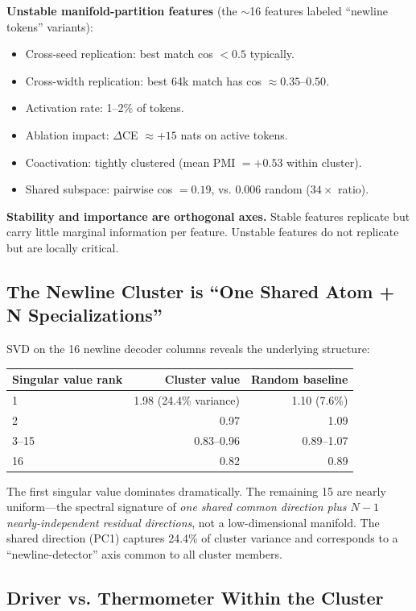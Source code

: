 \documentclass[11pt]{article}
\begin{document}
\textbf{Unstable manifold-partition features} (the $\sim$16 features labeled
``newline tokens'' variants):
\begin{itemize}[leftmargin=*]
  \item Cross-seed replication: best match cos $< 0.5$ typically.
  \item Cross-width replication: best 64k match has cos $\approx 0.35$--$0.50$.
  \item Activation rate: 1--2\% of tokens.
  \item Ablation impact: $\Delta$CE $\approx +15$ nats on active tokens.
  \item Coactivation: tightly clustered (mean PMI $= +0.53$ within cluster).
  \item Shared subspace: pairwise cos $= 0.19$, vs. 0.006 random ($34\times$ ratio).
\end{itemize}

\textbf{Stability and importance are orthogonal axes.} Stable features replicate
but carry little marginal information per feature. Unstable features do not
replicate but are locally critical.

\subsection{The Newline Cluster is ``One Shared Atom + N Specializations''}

SVD on the 16 newline decoder columns reveals the underlying structure:

\begin{tabular}{lrr}
\toprule
Singular value rank & Cluster value & Random baseline \\
\midrule
1 & 1.98 (24.4\% variance) & 1.10 (7.6\%) \\
2 & 0.97 & 1.09 \\
3--15 & 0.83--0.96 & 0.89--1.07 \\
16 & 0.82 & 0.89 \\
\bottomrule
\end{tabular}

The first singular value dominates dramatically. The remaining 15 are nearly
uniform---the spectral signature of \emph{one shared common direction plus
$N{-}1$ nearly-independent residual directions}, not a low-dimensional
manifold. The shared direction (PC1) captures 24.4\% of cluster variance and
corresponds to a ``newline-detector'' axis common to all cluster members.

\subsection{Driver vs. Thermometer Within the Cluster}
\end{document}
